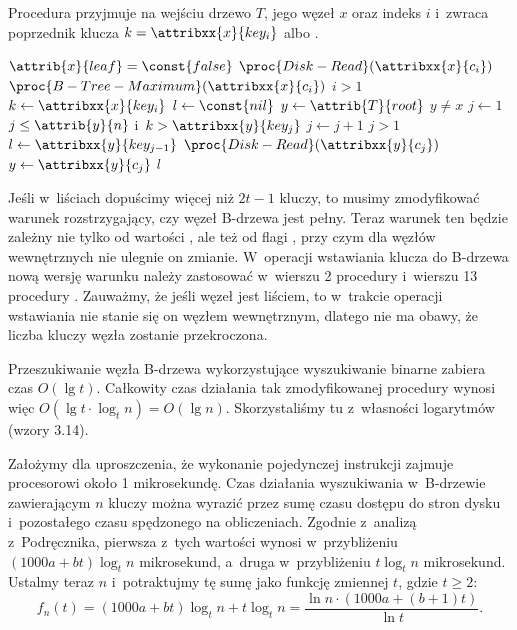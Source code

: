 Procedura przyjmuje na wejściu drzewo $T$, jego węzeł $x$ oraz indeks $i$ i~zwraca poprzednik klucza $k=\attribxx{x}{key_i}$ albo .
\begin{codebox}
\li \If $\attrib{x}{leaf}=\const{false}$
\li   \Then $\proc{Disk-Read}(\attribxx{x}{c_i})$
\li     \Return $\proc{B-Tree-Maximum}(\attribxx{x}{c_i})$
    \End
\li \If $i>1$
\li   \Then \Return {}
    \End
\li $k\gets\attribxx{x}{key_i}$
\li $l\gets\const{nil}$
\li $y\gets\attrib{T}{root}$
\li \While $y\ne x$
\li   \Do $j\gets1$
\li   \While $j\le\attrib{y}{n}$ i~$k>\attribxx{y}{key_j}$
\li     \Do $j\gets j+1$
      \End
\li   \If $j>1$
\li     \Then $l\gets\attribxx{y}{key_{j-1}}$
      \End
\li   $\proc{Disk-Read}(\attribxx{y}{c_j})$
\li   $y\gets\attribxx{y}{c_j}$
    \End
\li \Return $l$
\end{codebox}

\exercise %
\exercise %
Jeśli w~liściach dopuścimy więcej niż $2t-1$ kluczy, to musimy zmodyfikować warunek rozstrzygający, czy węzeł B-drzewa jest pełny.
Teraz warunek ten będzie zależny nie tylko od wartości , ale też od flagi , przy czym dla węzłów wewnętrznych nie ulegnie on zmianie.
W~operacji wstawiania klucza do B-drzewa nową wersję warunku należy zastosować w~wierszu 2 procedury  i~wierszu 13 procedury .
Zauważmy, że jeśli węzeł jest liściem, to w~trakcie operacji wstawiania nie stanie się on węzłem wewnętrznym, dlatego nie ma obawy, że liczba kluczy węzła zostanie przekroczona.

\exercise %
Przeszukiwanie węzła B-drzewa wykorzystujące wyszukiwanie binarne zabiera czas $O(\lg t)$.
Całkowity czas działania tak zmodyfikowanej procedury  wynosi więc $O(\lg t\cdot\log_tn)=O(\lg n)$.
Skorzystaliśmy tu z~własności logarytmów (wzory 3.14).

\exercise %

\noindent Założymy dla uproszczenia, że wykonanie pojedynczej instrukcji zajmuje procesorowi około 1 mikrosekundę.
Czas działania wyszukiwania w~B-drzewie zawierającym $n$ kluczy można wyrazić przez sumę czasu dostępu do stron dysku i~pozostałego czasu spędzonego na obliczeniach.
Zgodnie z~analizą z~Podręcznika, pierwsza z~tych wartości wynosi w~przybliżeniu $(1000a+bt)\log_tn$ mikrosekund, a~druga w~przybliżeniu $t\log_tn$ mikrosekund.
Ustalmy teraz $n$ i~potraktujmy tę sumę jako funkcję zmiennej $t$, gdzie $t\ge2$:
\[
	f_n(t) = (1000a+bt)\log_tn+t\log_tn = \frac{\ln n\cdot(1000a+(b+1)t)}{\ln t}.
\]

